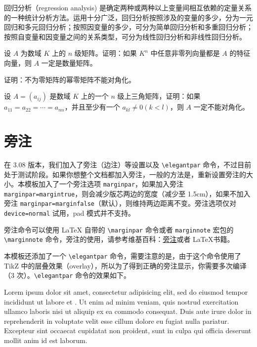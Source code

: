 \documentclass[cn,11pt]{elegantbook}
\begin{document}
\begin{conclusion}
回归分析（regression analysis) 是确定两种或两种以上变量间相互依赖的定量关系的一种统计分析方法。运用十分广泛，回归分析按照涉及的变量的多少，分为一元回归和多元回归分析；按照因变量的多少，可分为简单回归分析和多重回归分析；按照自变量和因变量之间的关系类型，可分为线性回归分析和非线性回归分析。
\end{conclusion}

\begin{problemset}
\item 设 $A$ 为数域 $K$ 上的 $n$ 级矩阵。证明：如果 $K^n$ 中任意非零列向量都是 $A$ 的特征向量，则 $A$ 一定是数量矩阵。
\item 证明：不为零矩阵的幂零矩阵不能对角化。
\item 设 $A = (a_{ij})$ 是数域 $K$ 上的一个 $n$ 级上三角矩阵，证明：如果 $a_{11} = a_{22} = \cdots = a_{nn}$，并且至少有一个 $a_{kl} \not = 0 (k < l)$，则 $A$ 一定不能对角化。
\end{problemset}

\chapter{旁注}
在 3.08 版本，我们加入了旁注（边注）等设置以及 \lstinline{\elegantpar} 命令，不过目前处于测试阶段。如果你想整个文档都加入旁注，一般的方法是，重新设置旁注的大小。本模板加入了一个旁注选项 \lstinline{marginpar}，如果加入旁注 \lstinline{marginpar=margintrue}，则会减少版芯两边的宽度（减少至 1.5cm），如果不加入旁注 \lstinline{marginpar=marginfalse}（默认），则维持两边距离不变。旁注选项仅对 \lstinline{device=normal} 试用，pad 模式并不支持。

旁注命令可以使用 \LaTeX{} 自带的 \lstinline{\marginpar} 命令或者 \lstinline{marginnote}  宏包的  \lstinline{\marginnote}  命令，旁注的使用，请参考维基百科：\href{https://en.wikibooks.org/wiki/LaTeX/Footnotes_and_Margin_Notes#Margin_Notes}{旁注}或者 \LaTeX {}书籍。

本模板还添加了一个 \lstinline{\elegantpar} 命令，需要注意的是，由于这个命令使用了 TikZ 中的层叠效果（overlay），所以为了得到正确的旁注显示，你需要多次编译（3 次）。\lstinline{\elegantpar} 命令的效果如下。

Lorem ipsum dolor sit amet, consectetur adipisicing elit, sed do eiusmod
tempor incididunt ut labore et . Ut enim ad minim veniam,
quis nostrud exercitation ullamco laboris nisi ut aliquip ex ea commodo
consequat. Duis aute irure dolor in reprehenderit in voluptate velit esse
cillum dolore eu fugiat nulla pariatur. Excepteur sint occaecat cupidatat non
proident, sunt in culpa qui officia deserunt mollit anim id est laborum.
\end{document}
